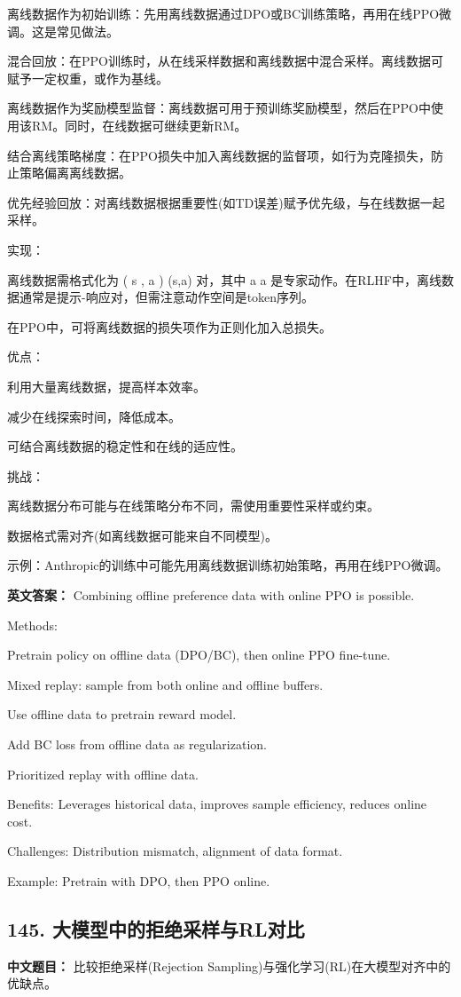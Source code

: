 \documentclass[10pt,a4paper]{ctexart}
\begin{document}
离线数据作为初始训练：先用离线数据通过DPO或BC训练策略，再用在线PPO微调。这是常见做法。

混合回放：在PPO训练时，从在线采样数据和离线数据中混合采样。离线数据可赋予一定权重，或作为基线。

离线数据作为奖励模型监督：离线数据可用于预训练奖励模型，然后在PPO中使用该RM。同时，在线数据可继续更新RM。

结合离线策略梯度：在PPO损失中加入离线数据的监督项，如行为克隆损失，防止策略偏离离线数据。

优先经验回放：对离线数据根据重要性(如TD误差)赋予优先级，与在线数据一起采样。

实现：

离线数据需格式化为 
(
s
,
a
)
(s,a) 对，其中 
a
a 是专家动作。在RLHF中，离线数据通常是提示-响应对，但需注意动作空间是token序列。

在PPO中，可将离线数据的损失项作为正则化加入总损失。

优点：

利用大量离线数据，提高样本效率。

减少在线探索时间，降低成本。

可结合离线数据的稳定性和在线的适应性。

挑战：

离线数据分布可能与在线策略分布不同，需使用重要性采样或约束。

数据格式需对齐(如离线数据可能来自不同模型)。

示例：Anthropic的训练中可能先用离线数据训练初始策略，再用在线PPO微调。

\textbf{英文答案：}
Combining offline preference data with online PPO is possible.

Methods:

Pretrain policy on offline data (DPO/BC), then online PPO fine-tune.

Mixed replay: sample from both online and offline buffers.

Use offline data to pretrain reward model.

Add BC loss from offline data as regularization.

Prioritized replay with offline data.

Benefits: Leverages historical data, improves sample efficiency, reduces online cost.

Challenges: Distribution mismatch, alignment of data format.

Example: Pretrain with DPO, then PPO online.

\subsection*{145. 大模型中的拒绝采样与RL对比}
\textbf{中文题目：} 比较拒绝采样(Rejection Sampling)与强化学习(RL)在大模型对齐中的优缺点。
\end{document}
